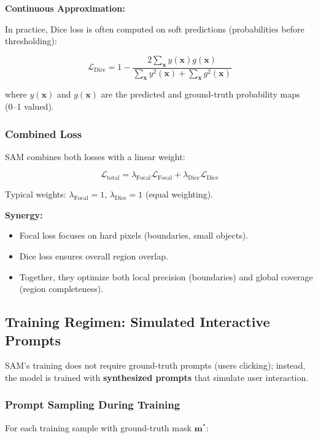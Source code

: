 \textbf{Continuous Approximation:}

In practice, Dice loss is often computed on soft predictions (probabilities before thresholding):

\[ \mathcal{L}_{\text{Dice}} = 1 - \frac{2\sum_{\mathbf{x}} y(\mathbf{x}) g(\mathbf{x})}{\sum_{\mathbf{x}} y^2(\mathbf{x}) + \sum_{\mathbf{x}} g^2(\mathbf{x})} \]

where $y(\mathbf{x})$ and $g(\mathbf{x})$ are the predicted and ground-truth probability maps (0–1 valued).

\subsubsection{Combined Loss}

SAM combines both losses with a linear weight:

\[ \mathcal{L}_{\text{total}} = \lambda_{\text{Focal}} \mathcal{L}_{\text{Focal}} + \lambda_{\text{Dice}} \mathcal{L}_{\text{Dice}} \]

Typical weights: $\lambda_{\text{Focal}} = 1$, $\lambda_{\text{Dice}} = 1$ (equal weighting).

\textbf{Synergy:}

\begin{itemize}
    \item Focal loss focuses on hard pixels (boundaries, small objects).
    \item Dice loss ensures overall region overlap.
    \item Together, they optimize both local precision (boundaries) and global coverage (region completeness).
\end{itemize}

\subsection{Training Regimen: Simulated Interactive Prompts}

SAM's training does not require ground-truth prompts (users clicking); instead, the model is trained with \textbf{synthesized prompts} that simulate user interaction.

\subsubsection{Prompt Sampling During Training}

For each training sample with ground-truth mask $\mathbf{m}^*$:

